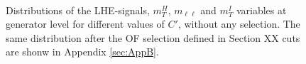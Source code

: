 \begin{figure}[htbp]
\centering
{}
\\
\caption{ 
    Distributions of the LHE-signals, $m_T^H$, $m_{\ell \ell}$ and  $m_T^I$ variables at generator level for different values of $C'$, without any selection. The same distribution after the OF selection defined in Section XX cuts are shonw in Appendix \ref{sec:AppB}.}
    \label{fig:cprime}
\end{figure}



